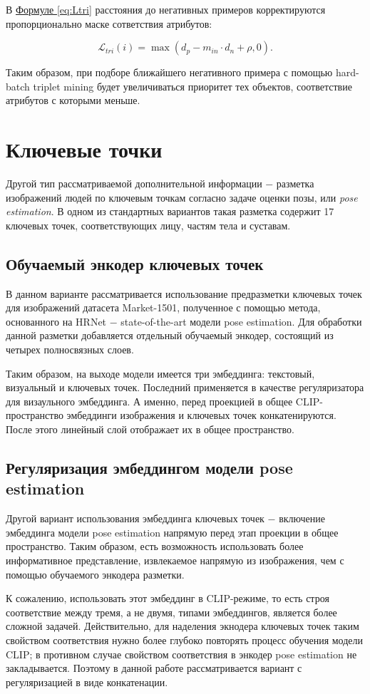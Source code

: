 В \hyperref[eq:Ltri]{Формуле \ref*{eq:Ltri}} расстояния до негативных примеров корректируются пропорционально маске сответствия атрибутов:

\begin{equation}
	\mathcal L_{tri} (i) = \max \left( d_p - m_{in} \cdot d_n + \rho, 0 \right).
\end{equation}

Таким образом, при подборе ближайшего негативного примера с помощью hard-batch triplet mining будет увеличиваться приоритет тех объектов, соответствие атрибутов с которыми меньше.


\section{Ключевые точки}

Другой тип рассматриваемой дополнительной информации $-$ разметка изображений людей по ключевым точкам согласно задаче оценки позы, или \textit{pose estimation}. В одном из стандартных вариантов такая разметка содержит 17 ключевых точек, соответствующих лицу, частям тела и суставам.

\subsection{Обучаемый энкодер ключевых точек}

В данном варианте рассматривается использование предразметки ключевых точек для изображений датасета Market-1501, полученное с помощью метода, основанного на HRNet \cite{sun2019deep} $-$ state-of-the-art модели pose estimation. Для обработки данной разметки добавляется отдельный обучаемый энкодер, состоящий из четырех полносвязных слоев. 

Таким образом, на выходе модели имеется три эмбеддинга: текстовый, визуальный и ключевых точек. Последний применяется в качестве регуляризатора для визаульного эмбеддинга. А именно, перед проекцией в общее CLIP-пространство эмбеддинги изображения и ключевых точек конкатенируются. После этого линейный слой отображает их в общее пространство.

\subsection{Регуляризация эмбеддингом модели pose estimation}

Другой вариант использования эмбеддинга ключевых точек $-$ включение эмбеддинга модели pose estimation напрямую перед этап проекции в общее пространство. Таким образом, есть возможность использовать более информативное представление, извлекаемое напрямую из изображения, чем с помощью обучаемого энкодера разметки.

К сожалению, использовать этот эмбеддинг в CLIP-режиме, то есть строя соответствие между тремя, а не двумя, типами эмбеддингов, является более сложной задачей. Действительно, для наделения экнодера ключевых точек таким свойством соответствия нужно более глубоко повторять процесс обучения модели CLIP; в противном случае свойством соответствия в энкодер pose estimation не закладывается. Поэтому в данной работе рассматривается вариант с регуляризацией в виде конкатенации.

